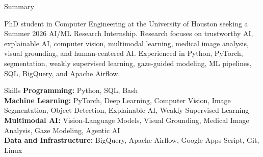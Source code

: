 \documentclass[11pt]{resume}
\begin{document}
\begin{rSection}{Summary}

PhD student in Computer Engineering at the University of Houston seeking a Summer 2026 AI/ML Research Internship. Research focuses on trustworthy AI, explainable AI, computer vision, multimodal learning, medical image analysis, visual grounding, and human-centered AI. Experienced in Python, PyTorch, segmentation, weakly supervised learning, gaze-guided modeling, ML pipelines, SQL, BigQuery, and Apache Airflow.

\end{rSection}

\begin{rSection}{Skills}
\textbf{Programming:} Python, SQL, Bash \\
\textbf{Machine Learning:} PyTorch, Deep Learning, Computer Vision, Image Segmentation, Object Detection, Explainable AI, Weakly Supervised Learning \\
\textbf{Multimodal AI:} Vision-Language Models, Visual Grounding, Medical Image Analysis, Gaze Modeling, Agentic AI \\
\textbf{Data and Infrastructure:} BigQuery, Apache Airflow, Google Apps Script, Git, Linux
\end{rSection}
\end{document}
